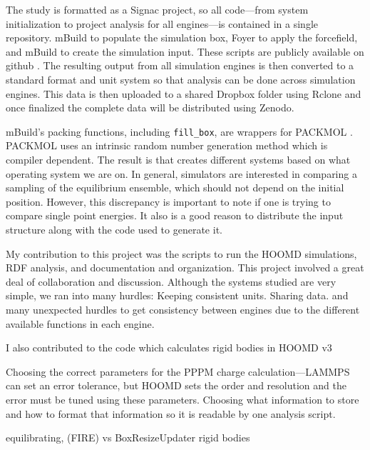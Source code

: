 The study is formatted as a Signac project, so all code---from system initialization to project analysis for all engines---is contained in a single repository.
mBuild to populate the simulation box, Foyer to apply the forcefield, and mBuild to create the simulation input.
These scripts are publicly available on github \citep{reproducibility}.
The resulting output from all simulation engines is then converted to a standard format and unit system so that analysis can be done across simulation engines.
This data is then uploaded to a shared Dropbox folder using Rclone and once finalized the complete data will be distributed using Zenodo.

mBuild's packing functions, including \lstinline{fill_box}, are wrappers for PACKMOL \citep{Martinez2003, Martinez2009}.
PACKMOL uses an intrinsic random number generation method which is compiler dependent. 
The result is that creates different systems based on what operating system we are on.
In general, simulators are interested in comparing a sampling of the equilibrium ensemble, which should not depend on the initial position.
However, this discrepancy is important to note if one is trying to compare single point energies.
It also is a good reason to distribute the input structure along with the code used to generate it.

My contribution to this project was the scripts to run the HOOMD simulations, RDF analysis, and documentation and organization. 
This project involved a great deal of collaboration and discussion.
Although the systems studied are very simple, we ran into many hurdles:
Keeping consistent units.
Sharing data.
and many unexpected hurdles to get consistency between engines due to the different available functions in each engine. %



I also contributed to the code which calculates rigid bodies in HOOMD v3 %

Choosing the correct parameters for the PPPM charge calculation---LAMMPS can set an error tolerance, but HOOMD sets the order and resolution and the error must be tuned using these parameters.
Choosing what information to store and how to format that information so it is readable by one analysis script. 

equilibrating, (FIRE) vs BoxResizeUpdater
rigid bodies

